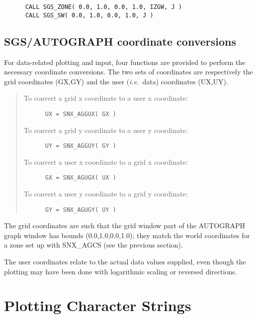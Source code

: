 \begin{verbatim}
      CALL SGS_ZONE( 0.0, 1.0, 0.0, 1.0, IZGW, J )
      CALL SGS_SW( 0.0, 1.0, 0.0, 1.0, J )
\end{verbatim}


\subsection {SGS/AUTOGRAPH coordinate conversions}

For data-related plotting and input, four functions are
provided to perform the necessary coordinate conversions.
The two sets of coordinates are respectively the grid
coordinates (GX,GY) and the user ({\em i.e.}\ data) coordinates (UX,UY).

\begin{quote}
To convert a grid x coordinate to a user x coordinate:

\begin{verbatim}
      UX = SNX_AGGUX( GX )
\end{verbatim}

To convert a grid y coordinate to a user y coordinate:

\begin{verbatim}
      UY = SNX_AGGUY( GY )
\end{verbatim}

To convert a user x coordinate to a grid x coordinate:

\begin{verbatim}
      GX = SNX_AGUGX( UX )
\end{verbatim}

To convert a user y coordinate to a grid y coordinate:

\begin{verbatim}
      GY = SNX_AGUGY( UY )
\end{verbatim}
\end{quote}

The grid coordinates are such that the grid window part of
the AUTOGRAPH graph window has bounds (0.0,1.0,0.0,1.0);
they match the world coordinates for a zone set up with SNX\_AGCS
(see the previous section).

The user coordinates relate to the actual data values
supplied, even though the plotting may have been done with
logarithmic scaling or reversed directions.


\section {Plotting Character Strings}

